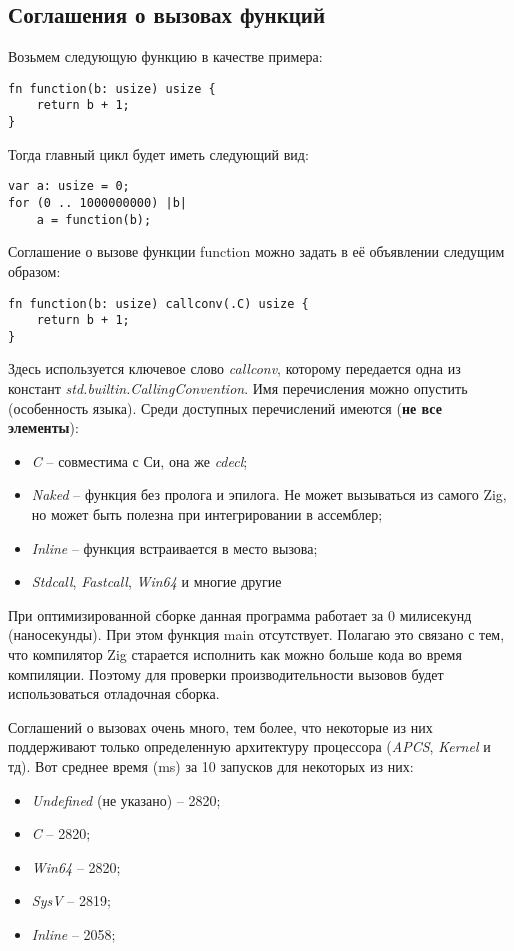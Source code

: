\subsection{Соглашения о вызовах функций}

Возьмем следующую функцию в качестве примера:
\begin{lstlisting}
fn function(b: usize) usize {
    return b + 1;
}
\end{lstlisting}

Тогда главный цикл будет иметь следующий вид:
\begin{lstlisting}
var a: usize = 0;
for (0 .. 1000000000) |b|
    a = function(b);
\end{lstlisting}

Соглашение о вызове функции function можно задать в её объявлении следущим образом:
\begin{lstlisting}
fn function(b: usize) callconv(.C) usize {
    return b + 1;
}
\end{lstlisting}

Здесь используется ключевое слово \textit{callconv}, которому передается одна из констант \textit{std.builtin.CallingConvention}. Имя перечисления можно опустить (особенность языка). Среди доступных перечислений имеются (\textbf{не все элементы}):
\begin{itemize}
    \item \textit{C} -- совместима с Си, она же \textit{cdecl};
    \item \textit{Naked} -- функция без пролога и эпилога. Не может вызываться из самого Zig, но может быть полезна при интегрировании в ассемблер;
    \item \textit{Inline} -- функция встраивается в место вызова;
    \item \textit{Stdcall}, \textit{Fastcall}, \textit{Win64} и многие другие
\end{itemize}

При оптимизированной сборке данная программа работает за 0 милисекунд (наносекунды). При этом функция main отсутствует. Полагаю это связано с тем, что компилятор Zig старается исполнить как можно больше кода во время компиляции. Поэтому для проверки производительности вызовов будет использоваться отладочная сборка.

Соглашений о вызовах очень много, тем более, что некоторые из них поддерживают только определенную архитектуру процессора (\textit{APCS}, \textit{Kernel} и тд). Вот среднее время (ms) за 10 запусков для некоторых из них:
\begin{itemize}
    \item \textit{Undefined} (не указано) -- 2820;
    \item \textit{C} -- 2820;
    \item \textit{Win64} -- 2820;
    \item \textit{SysV} -- 2819;
    \item \textit{Inline} -- 2058;
\end{itemize}

